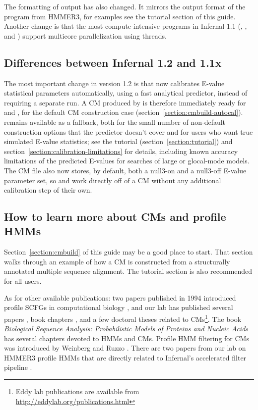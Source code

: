 The formatting of  output has also changed. It mirrors
the output format of the  program from HMMER3, for
examples see the tutorial section of this guide. Another change is
that the most compute-intensive programs in Infernal 1.1
(, ,  and
) support multicore parallelization using threads.

\subsection{Differences between Infernal 1.2 and 1.1x}

The most important change in version 1.2 is that  now
calibrates E-value statistical parameters automatically, using a fast
analytical predictor, instead of requiring a separate
 run. A CM produced by  is therefore
immediately ready for  and , for the
default CM construction case (section~\ref{section:cmbuild-autocal}).
 remains available as a fallback, both for the small
number of non-default construction options that the predictor doesn't
cover and for users who want true simulated E-value statistics; see
the tutorial (section~\ref{section:tutorial}) and
section~\ref{section:calibration-limitations} for details, including
known accuracy limitations of the predicted E-values for
 searches of large or glocal-mode models. The CM file
also now stores, by default, both a null3-on and a null3-off E-value
parameter set, so  and  work directly off of a CM without any additional
calibration step of their own.

\subsection{How to learn more about CMs and profile HMMs}

Section~\ref{section:cmbuild} of this guide may be a good place to
start. That section walks through an example of how a CM is
constructed from a structurally annotated multiple sequence alignment.
The tutorial section is also recommended for all users.

As for other available publications: two papers published in 1994
introduced profile SCFGs in computational biology
\citep{Sakakibara94c,Eddy94}, and our lab has published several papers
\citep{Eddy02b,KleinEddy03,NawrockiEddy07,Nawrocki09,KolbeEddy09,KolbeEddy11},
book chapters \citep{Eddy06b,Nawrocki14}, and a few doctoral
theses \citep{Klein03,Nawrocki09b,Kolbe10} related to
CMs\footnote{Eddy lab publications are available from
\url{http://eddylab.org/publications.html}}. The book
\emph{Biological Sequence Analysis: Probabilistic Models of Proteins
and Nucleic Acids} \citep{Durbin98} has several chapters devoted to
HMMs and CMs. Profile HMM filtering for CMs was introduced by Weinberg
and Ruzzo
\citep{WeinbergRuzzo04,WeinbergRuzzo04b,WeinbergRuzzo06}. There are
two papers from our lab on HMMER3 profile HMMs that are directly
related to Infernal's accelerated filter pipeline
\citep{Eddy08,Eddy11}.

